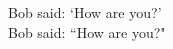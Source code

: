 \documentclass[12pt, a4paper, onecolumn]{article}
\begin{document}
	
	Bob said: `How are you?' \\[12pt]	%
	
	Bob said: ``How are you?"			%
	 
\end{document}
